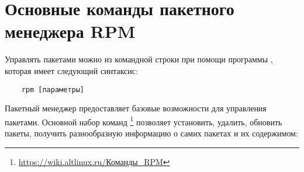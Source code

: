 \chapter{Основные команды пакетного менеджера RPM}\label{basic-package-manager-commands}
Управлять пакетами можно из командной строки при помощи программы , которая имеет следующий синтаксис:
\begin{verbatim}
    rpm [параметры]
\end{verbatim}

Пакетный менеджер  предоставляет базовые возможности для управления пакетами. Основной набор команд%
\footnote{\href{https://wiki.altlinux.ru/\%D0\%9A\%D0\%BE\%D0\%BC\%D0\%B0\%D0\%BD\%D0\%B4\%D1\%8B_RPM}{https://wiki.altlinux.ru/Команды\_RPM}}
позволяет установить, удалить, обновить пакеты, получить разнообразную информацию о самих пакетах и их содержимом:


